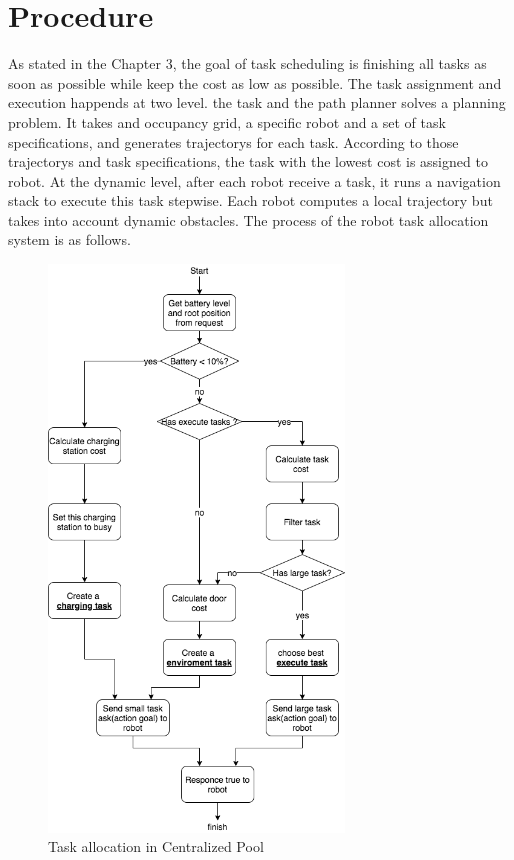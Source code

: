 \section{Procedure}
As stated in the Chapter 3, the goal of task scheduling is finishing all tasks as soon as possible while keep the cost as low as possible. 
The task assignment and execution happends at two level. \cite{Ivan2017} the task and the path planner solves a planning problem. It takes and occupancy grid, a specific robot and a set of task specifications, and generates trajectorys for each task. According to those trajectorys and task specifications, the task with the lowest cost is assigned to robot.
At the dynamic level, after each robot receive a task, it runs a navigation stack to execute this task stepwise. Each robot computes a local trajectory but takes into account dynamic obstacles.
The process of the robot task allocation system is as follows.


\begin{figure}[htbp]
    \centering
    \includegraphics[width = 0.7\textwidth]{content/images/ch4/centralized_task_select.drawio.png}
    \caption{Task allocation in Centralized Pool}
    \label{fig:centralized_task_allocation}
\end{figure}
